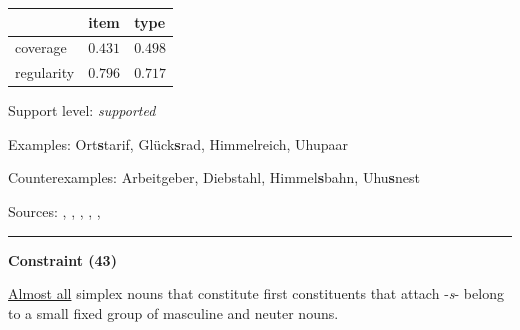 \vspace{-0.35em}

\begin{table}[!ht]
\begin{center}

\begin{tabularx}{\columnwidth}{|X|X|X|}
\hline
 & item & type \\
\hline
 coverage & $0.431$ & $0.498$ \\
\hline
 regularity & $0.796$ & $0.717$ \\
\hline
\end{tabularx}
\end{center}
\end{table}

\vspace{-1.35em}

\noindent
Support level: \textit{supported}

\vspace{0.3em}

\noindent
Examples: Ort\textbf{s}tarif, Glück\textbf{s}rad, Himmel{\zeroLinker}reich, Uhu{\zeroLinker}paar

\noindent
Counterexamples: Arbeit{\zeroLinker}geber, Dieb{\zeroLinker}stahl, Himmel\textbf{s}bahn, Uhu\textbf{s}nest

\vspace{0.3em}

\noindent
Sources: \citet[572]{fuhrhop_kuerschner_2015}, \citet[110]{kuerschner_2005}, \citet[7, 17]{nuebling_szczepaniak_2008}, \citet[9]{schaefer_pankratz_2018}, \citet[434]{wegener_2003}, \citet[180, 181, 182]{wegener_2005}


\hrule




\vspace{0.4em}

\begin{center}
\textbf{Constraint (43)}
\end{center}

\noindent
\underline{Almost all} simplex nouns that constitute first constituents that attach -\textit{s}- belong to a small fixed group of masculine and neuter nouns.
\vspace{0.35em}


